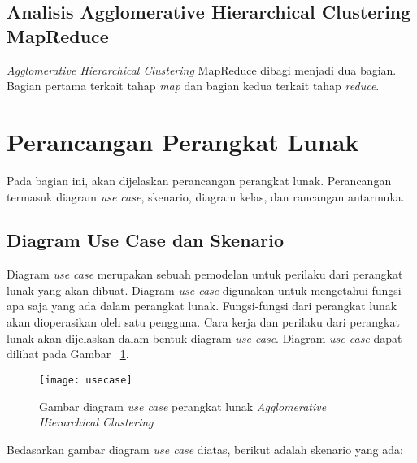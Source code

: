 \subsection{Analisis Agglomerative Hierarchical Clustering MapReduce}

\textit{Agglomerative Hierarchical Clustering} MapReduce dibagi menjadi dua bagian. Bagian pertama terkait tahap \textit{map} dan bagian kedua terkait tahap \textit{reduce}. 


\section{Perancangan Perangkat Lunak}

Pada bagian ini, akan dijelaskan perancangan perangkat lunak.  Perancangan termasuk diagram \textit{use case}, skenario, diagram kelas, dan rancangan antarmuka. 

\subsection{Diagram Use Case dan Skenario}

Diagram \textit{use case} merupakan sebuah pemodelan untuk perilaku dari perangkat lunak yang akan dibuat. Diagram \textit{use case} digunakan untuk mengetahui fungsi apa saja yang ada dalam perangkat lunak. Fungsi-fungsi dari perangkat lunak akan dioperasikan oleh satu pengguna. Cara kerja dan perilaku dari perangkat lunak akan dijelaskan dalam bentuk diagram \textit{use case}. Diagram \textit{use case} dapat dilihat pada Gambar ~\ref{fig:usecase}.

\begin{figure}[H]
    \centering  
    \texttt{[image: usecase]}  
    \caption[Gambar diagram \textit{use case} perangkat lunak \textit{Agglomerative Hierarchical Clustering}]{Gambar diagram \textit{use case} perangkat lunak \textit{Agglomerative Hierarchical Clustering}} 
    \label{fig:usecase} 
\end{figure}

Bedasarkan gambar diagram \textit{use case} diatas, berikut adalah skenario yang ada:

